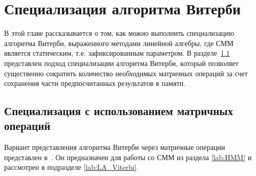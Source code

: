 \section{Специализация алгоритма Витерби}
В этой главе рассказывается о том, как можно выполнить 
специализацию алгоритма Витерби, выраженного методами 
линейной алгебры, где СММ является статическим, т.е. 
зафиксированным параметром.
В разделе~\ref{lab:LA_spec} представлен подход специализации 
алгоритма Витерби, который позволяет существенно сократить 
количество необходимых матричных операций за счет сохранения 
части предпосчитанных результатов в памяти.

\subsection{Специализация с использованием матричных\\ операций}
\label{lab:LA_spec}
Вариант представления
алгоритма Витерби через матричные операции представлен в~\cite{LA_Viterbi}.
Он предназначен для работы со СММ из раздела 
\ref{lab:HMM} и рассмотрен в подразделе 
\ref{lab:LA_Viterbi}.

